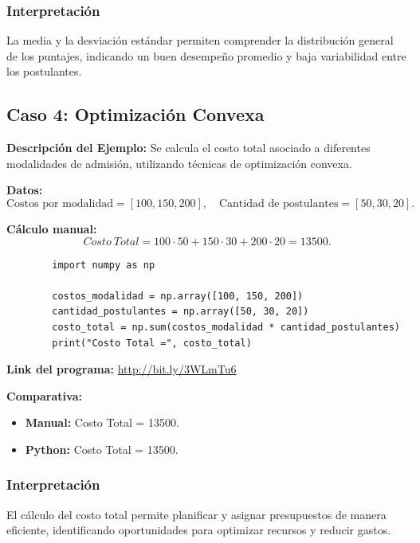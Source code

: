 \documentclass[12pt,a4,oneside]{book}
\begin{document}
	\subsubsection{Interpretación}
	
	La media y la desviación estándar permiten comprender la distribución general de los puntajes, indicando un buen desempeño promedio y baja variabilidad entre los postulantes.
	
	\subsection{Caso 4: Optimización Convexa}
	
	\textbf{Descripción del Ejemplo:}  
	Se calcula el costo total asociado a diferentes modalidades de admisión, utilizando técnicas de optimización convexa.
	
	\textbf{Datos:}
	\[
	\text{Costos por modalidad} = [100, 150, 200], \quad \text{Cantidad de postulantes} = [50, 30, 20].
	\]
	
	\textbf{Cálculo manual:}
	\[
	Costo\ Total = 100 \cdot 50 + 150 \cdot 30 + 200 \cdot 20 = 13500.
	\]
	
	\begin{verbatim}
		import numpy as np
		
		costos_modalidad = np.array([100, 150, 200])
		cantidad_postulantes = np.array([50, 30, 20])
		costo_total = np.sum(costos_modalidad * cantidad_postulantes)
		print("Costo Total =", costo_total)
	\end{verbatim}
	
	\textbf{Link del programa:} \url{http://bit.ly/3WLmTu6}
	
	\textbf{Comparativa:}
	\begin{itemize}
		\item \textbf{Manual:} Costo Total = 13500.
		\item \textbf{Python:} Costo Total = 13500.
	\end{itemize}
	
	\subsubsection{Interpretación}
	
	El cálculo del costo total permite planificar y asignar presupuestos de manera eficiente, identificando oportunidades para optimizar recursos y reducir gastos.
	
\end{document}
